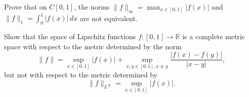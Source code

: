 \pagebreak


\begin{problem}{7}
Prove that on $C[0, 1]$, the norms $\|f\|_\infty = \max_{x \in [0,1]} |f(x)|$ and $\|f\|_1 = \int_0^1 |f(x)| \, dx$ are not equivalent.
\end{problem}

\begin{solution}
\end{solution}

\pagebreak


\begin{problem}{8}
Show that the space of Lipschitz functions $f : [0, 1] \to \mathbb{R}$ is a complete metric space with respect to the metric determined by the norm
\[
  \|f\| = \sup_{x \in [0,1]} |f(x)| + \sup_{x, y \in [0,1], x \neq y} \frac{|f(x) - f(y)|}{|x - y|},
\]
but not with respect to the metric determined by
\[
\|f\|_{L^\infty} = \sup_{x \in [0,1]} |f(x)|.
\]
\end{problem}

\begin{solution}
\end{solution}
